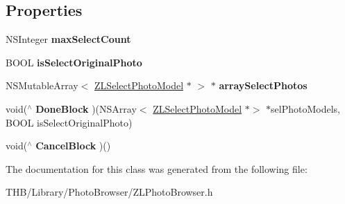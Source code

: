 \subsection*{Properties}
\begin{DoxyCompactItemize}
\item 
\mbox{\label{interface_z_l_photo_browser_a92f161fd084bea712625eef138ff437e}} 
N\+S\+Integer {\bfseries max\+Select\+Count}
\item 
\mbox{\label{interface_z_l_photo_browser_a60f708d13fb865342d58778fb018d4ec}} 
B\+O\+OL {\bfseries is\+Select\+Original\+Photo}
\item 
\mbox{\label{interface_z_l_photo_browser_a836a9a623c72dcb2766c89f8dd167abc}} 
N\+S\+Mutable\+Array$<$ \mbox{\hyperlink{interface_z_l_select_photo_model}{Z\+L\+Select\+Photo\+Model}} $\ast$ $>$ $\ast$ {\bfseries array\+Select\+Photos}
\item 
\mbox{\label{interface_z_l_photo_browser_a14cb9b36079552c5b0f73de191048f7f}} 
void($^\wedge$ {\bfseries Done\+Block} )(N\+S\+Array$<$ \mbox{\hyperlink{interface_z_l_select_photo_model}{Z\+L\+Select\+Photo\+Model}} $\ast$$>$ $\ast$sel\+Photo\+Models, B\+O\+OL is\+Select\+Original\+Photo)
\item 
\mbox{\label{interface_z_l_photo_browser_a0a9b37492ef3cb7ee7c4356ce6b0b17e}} 
void($^\wedge$ {\bfseries Cancel\+Block} )()
\end{DoxyCompactItemize}


The documentation for this class was generated from the following file\+:\begin{DoxyCompactItemize}
\item 
T\+H\+B/\+Library/\+Photo\+Browser/Z\+L\+Photo\+Browser.\+h\end{DoxyCompactItemize}
